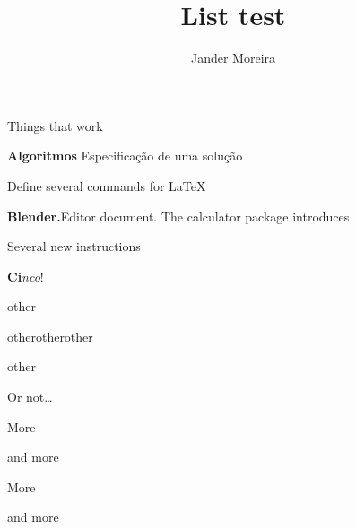 \documentclass[10pt]{beamer}
\title{List test}
\author{Jander Moreira}
\begin{document}
\maketitle

\begin{frame}
    Things that work

    \hrulefill
    \bigskip
    \small
    \begin{mybox}[columns = 3, equal height = rows, palette = Two]
        \item %
        \textbf{Algoritmos}\newline
        Especificação de uma solução
        \item %
        Define several commands for \LaTeX
        \item \textbf{Blender.}\newline Editor document. The calculator package introduces
        \item Several new instructions
        \item \textbf{Ci}\textit{nco}!
        \item other
        \item other\newline other\newline other
        \item other
    \end{mybox}
    \hrulefill

    \bigskip
    Or not\ldots
\end{frame}

\begin{frame}
    \begin{mybox}[continued, columns = 3, palette = Two]
        \item More
        \item <2> and more
        \item More
        \item and more
    \end{mybox}
\end{frame}
\end{document}
